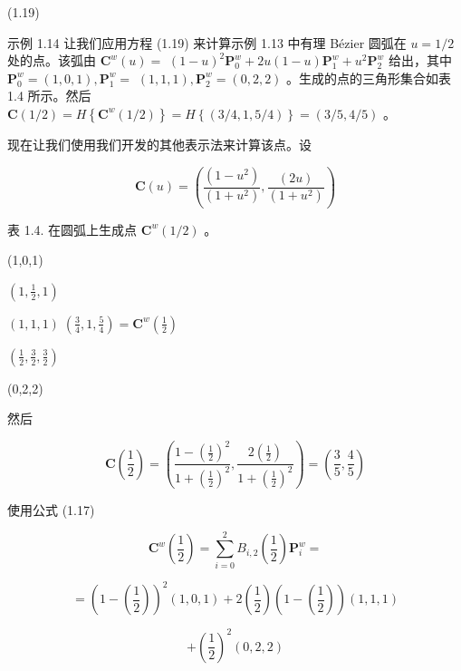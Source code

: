 \documentclass[../main.tex]{subfiles}
\begin{document}
(1.19)


示例 1.14 让我们应用方程 (1.19) 来计算示例 1.13 中有理 Bézier 圆弧在 \(u = 1/2\) 处的点。该弧由 \({\mathbf{C}}^{w}\left( u\right)  =\)  \({\left( 1 - u\right) }^{2}{\mathbf{P}}_{0}^{w} + {2u}\left( {1 - u}\right) {\mathbf{P}}_{1}^{w} + {u}^{2}{\mathbf{P}}_{2}^{w}\) 给出，其中 \({\mathbf{P}}_{0}^{w} = \left( {1,0,1}\right) ,{\mathbf{P}}_{1}^{w} =\)  \(\left( {1,1,1}\right) ,{\mathbf{P}}_{2}^{w} = \left( {0,2,2}\right)\) 。生成的点的三角形集合如表 1.4 所示。然后 \(\mathbf{C}\left( {1/2}\right)  = H\left\{  {{\mathbf{C}}^{w}\left( {1/2}\right) }\right\}   = H\left\{  \left( {3/4,1,5/4}\right) \right\}   = \left( {3/5,4/5}\right)\) 。

现在让我们使用我们开发的其他表示法来计算该点。设

\[
\mathbf{C}\left( u\right)  = \left( {\frac{\left( 1 - {u}^{2}\right) }{\left( 1 + {u}^{2}\right) },\frac{\left( 2u\right) }{\left( 1 + {u}^{2}\right) }}\right)
\]

表 1.4. 在圆弧上生成点 \({\mathbf{C}}^{w}\left( {1/2}\right)\) 。

\HRule

(1,0,1)

\hspace*{1em} \(\left( {1,\frac{1}{2},1}\right)\)

\(\left( {1,1,1}\right) \;\left( {\frac{3}{4},1,\frac{5}{4}}\right)  = {\mathbf{C}}^{w}\left( \frac{1}{2}\right)\)

\hspace*{1em} \(\left( {\frac{1}{2},\frac{3}{2},\frac{3}{2}}\right)\)

(0,2,2)

\HRule


然后

\[
\mathbf{C}\left( \frac{1}{2}\right)  = \left( {\frac{1 - {\left( \frac{1}{2}\right) }^{2}}{1 + {\left( \frac{1}{2}\right) }^{2}},\frac{2\left( \frac{1}{2}\right) }{1 + {\left( \frac{1}{2}\right) }^{2}}}\right)  = \left( {\frac{3}{5},\frac{4}{5}}\right)
\]

使用公式 (1.17)

\[
{\mathbf{C}}^{w}\left( \frac{1}{2}\right)  = \mathop{\sum }\limits_{{i = 0}}^{2}{B}_{i,2}\left( \frac{1}{2}\right) {\mathbf{P}}_{i}^{w} =
\]

\[
= {\left( 1 - \left( \frac{1}{2}\right) \right) }^{2}\left( {1,0,1}\right)  + 2\left( \frac{1}{2}\right) \left( {1 - \left( \frac{1}{2}\right) }\right) \left( {1,1,1}\right)
\]

\[
+ {\left( \frac{1}{2}\right) }^{2}\left( {0,2,2}\right)
\]
\end{document}
